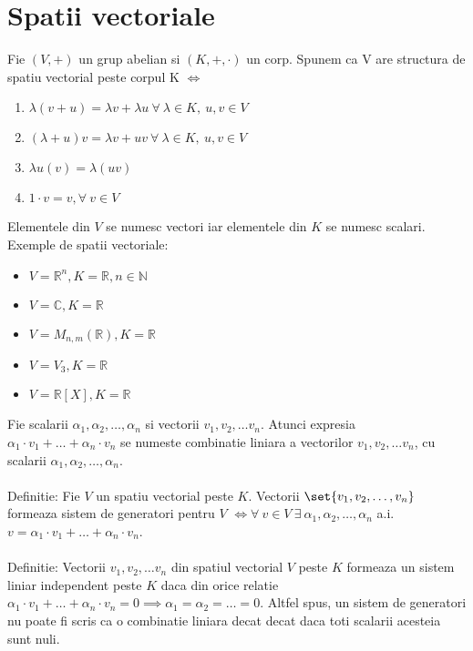 \documentclass{article}
\begin{document}
        \section{Spatii vectoriale}
        Fie $(V, +)$ un grup abelian si $(K, +, \cdot)$ un corp. Spunem ca V are structura de spatiu vectorial peste corpul K $\iff$
        	\begin{enumerate}
        		\item $\lambda(v + u)= \lambda v + \lambda u\ \forall\ \lambda \in K,\ u,v \in V$
        		\item $(\lambda + u)v = \lambda  v + uv\ \forall\ \lambda \in K,\ u,v \in V$
        		\item $ \lambda u \left(v\right) = \lambda \left(uv\right)$
        		\item $1 \cdot v = v, \forall \ v \in V$
        	\end{enumerate}
        Elementele din $V$ se numesc vectori iar elementele din $K$ se numesc scalari.\\
        Exemple de spatii vectoriale:
        \begin{itemize}
        	\item $V = \mathbb{R}^{n}, K = \mathbb{R}, n \in \mathbb{N}$
        	\item $V = \mathbb{C}, K = \mathbb{R}$
        	\item $V = M_{n,m}(\mathbb{R}), K = \mathbb{R}$
        	\item $V = V_{3}, K = \mathbb{R}$
        	\item $V = \mathbb{R}[X], K = \mathbb{R}$
        \end{itemize}
        Fie scalarii $\alpha_{1}, \alpha_{2}, \dots, \alpha_{n}$ si vectorii $v_{1}, v_{2}, \dots v_{n}$. Atunci expresia $\alpha_{1} \cdot v_{1} + \dots + \alpha_{n} \cdot v_{n}$ se numeste combinatie liniara a vectorilor $v_{1}, v_{2}, \dots v_{n}$, cu scalarii $\alpha_{1}, \alpha_{2}, \dots, \alpha_{n}$. \\ \\
        Definitie: Fie $V$ un spatiu vectorial peste $K$. Vectorii $\set{ v_{1}, v_2, \dots, v_{n}}$ formeaza sistem de generatori pentru $V$ $\iff \forall\ v \in V\ \exists\ \alpha_{1}, \alpha_{2}, \dots , \alpha_{n}$ a.i. $v = \alpha_{1} \cdot v_{1} + \dots + \alpha_{n} \cdot v_{n}$. \\ \\
        Definitie: Vectorii $v_{1}, v_{2}, \dots v_{n}$ din spatiul vectorial $V$ peste $K$ formeaza un sistem liniar independent peste $K$ daca din orice relatie $\alpha_{1} \cdot v_{1} + \dots + \alpha_{n} \cdot v_{n} = 0 \implies \alpha_{1} = \alpha_{2} = \dots = 0$. Altfel spus, un sistem de generatori nu poate fi scris ca o combinatie liniara decat decat daca toti scalarii acesteia sunt nuli. \\ \\
\end{document}
